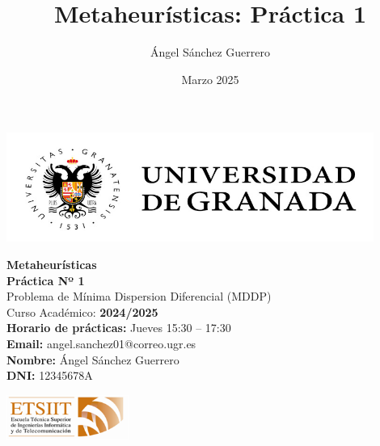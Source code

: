 \documentclass{article}
\title{Metaheurísticas: Práctica 1}
\author{Ángel Sánchez Guerrero}
\date{Marzo 2025}
\begin{document}
\thispagestyle{empty}

\begin{center}
    \includegraphics[width=12cm]{logo_ugr.jpg}
\end{center}

\vspace{2cm}

\begin{center}
    {\Huge \textbf{Metaheurísticas}} \\[3em]
    {\LARGE \textbf{Práctica Nº 1}} \\[1em]
    {\Large Problema de Mínima Dispersion Diferencial (MDDP)} \\[3em]

    {\large Curso Académico: \textbf{2024/2025}} \\[3em]
    
    {\large \textbf{Horario de prácticas:} Jueves 15:30 – 17:30} \\
    {\large \textbf{Email:} angel.sanchez01@correo.ugr.es} \\
    {\large \textbf{Nombre:} Ángel Sánchez Guerrero} \\
    {\large \textbf{DNI:} 12345678A} \\
    
\end{center}

\vfill

\begin{center}
    \includegraphics[width=4cm]{etsiit_logo.png}
\end{center}
\end{document}
